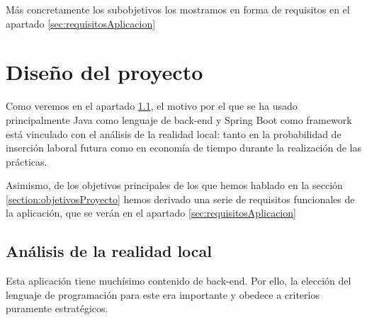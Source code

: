 \documentclass[a4paper,12pt]{report}
\begin{document}
		Más concretamente los subobjetivos los mostramos en forma de requisitos en el apartado \ref{sec:requisitosAplicacion}
		
		

		
		

		
		
		
		
		
		
		
		
		
		
			
			
	
		
	

		



		
	

		
	

		


		

		
		
		
		
	
	\chapter{Diseño del proyecto}  %
	
		
				

		
		Como veremos en el apartado \ref{sec:analisisRealitatLocal}, el motivo por el que se ha usado principalmente Java como lenguaje de back-end y Spring Boot como framework está vinculado con el análisis de la realidad local: tanto en la probabilidad de inserción laboral futura como en economía de tiempo durante la realización de las prácticas.
		
		Asimismo, de los objetivos principales de los que hemos hablado en la sección \ref{section:objetivosProyecto} hemos derivado una serie de requisitos funcionales de la aplicación, que se verán en el apartado \ref{sec:requisitosAplicacion}
		
		\section{Análisis de la realidad local}
		\label{sec:analisisRealitatLocal}
		
		Esta aplicación tiene muchísimo contenido de back-end. Por ello, la elección del lenguaje de programación para este era importante y obedece a criterios puramente estratégicos. 
		
\end{document}
